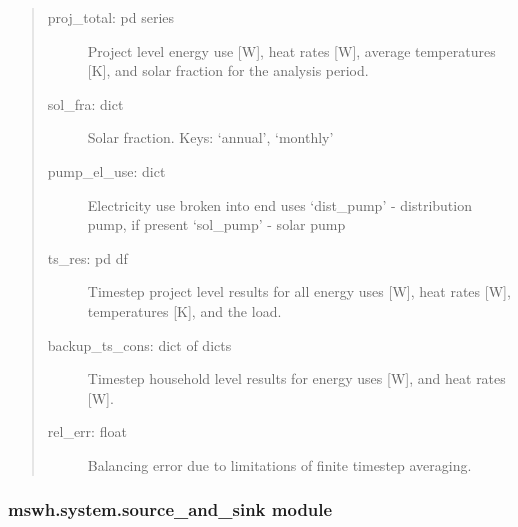 \documentclass[letterpaper,10pt,english,openany]{sphinxmanual}
\begin{document}
\begin{fulllineitems}
\begin{fulllineitems}
\begin{quote}
\begin{description}
\item[{proj\_total: pd series}] \leavevmode
Project level energy use {[}W{]}, heat rates {[}W{]},
average temperatures {[}K{]},
and solar fraction for the analysis period.

\item[{sol\_fra: dict}] \leavevmode
Solar fraction. Keys: ‘annual’, ‘monthly’

\item[{pump\_el\_use: dict}] \leavevmode
Electricity use broken into end uses
‘dist\_pump’ - distribution pump, if present
‘sol\_pump’ - solar pump

\item[{ts\_res: pd df}] \leavevmode
Timestep project level results for all energy uses {[}W{]},
heat rates {[}W{]}, temperatures {[}K{]}, and the load.

\item[{backup\_ts\_cons: dict of dicts}] \leavevmode
Timestep household level results for energy uses {[}W{]},
and heat rates {[}W{]}.

\item[{rel\_err: float}] \leavevmode
Balancing error due to limitations of finite
timestep averaging.

\end{description}
\end{quote}

\end{fulllineitems}


\begin{fulllineitems}
\label{\detokenize{source/mswh.system:mswh.system.models.System.weather}}
\end{fulllineitems}


\end{fulllineitems}



\subsubsection{mswh.system.source\_and\_sink module}
\label{\detokenize{source/mswh.system:module-mswh.system.source_and_sink}}\label{\detokenize{source/mswh.system:mswh-system-source-and-sink-module}}
\end{document}
